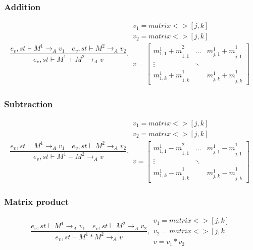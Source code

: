 \subsubsection{Addition}
\begin{equation}
	\frac { { e }_{ v },st\vdash { M }^{ 1 }{ \rightarrow  }_{ A }{ v }_{ 1 }\quad { e }_{ v },st\vdash { M }^{ 2 }{ \rightarrow  }_{ A }{ v }_{ 2 } }{ { e }_{ v },st\vdash { M }^{ 1 }+{ M }^{ 2 }{ \rightarrow  }_{ A }{ v } } ,\begin{matrix} { v }_{ 1 }=matrix<>[j,k] \\ { v }_{ 2 }=matrix<>[j,k] \\ v=\begin{bmatrix} { { m }_{ 1,1 }^{ 1 }+m }_{ 1,1 }^{ 2 } & \dots  & { { m }_{ j,1 }^{ 1 }+m }_{ j,1 }^{ 1 } \\ \vdots  & \ddots  &  \\ { { m }_{ 1,k }^{ 1 }+m }_{ 1,k }^{ 1 } &  & { { m }_{ j,k }^{ 1 }+m }_{ j,k }^{ 1 } \end{bmatrix} \end{matrix}
\end{equation}


\subsubsection{Subtraction}
\begin{equation}
	\frac { { e }_{ v },st\vdash { M }^{ 1 }{ \rightarrow  }_{ A }{ v }_{ 1 }\quad { e }_{ v },st\vdash { M }^{ 2 }{ \rightarrow  }_{ A }{ v }_{ 2 } }{ { e }_{ v },st\vdash { M }^{ 1 }-{ M }^{ 2 }{ \rightarrow  }_{ A }{ v } } ,\begin{matrix} { v }_{ 1 }=matrix<>[j,k] \\ { v }_{ 2 }=matrix<>[j,k] \\ v=\begin{bmatrix} { { m }_{ 1,1 }^{ 1 }-m }_{ 1,1 }^{ 2 } & \dots  & { { m }_{ j,1 }^{ 1 }-m }_{ j,1 }^{ 1 } \\ \vdots  & \ddots  &  \\ { { m }_{ 1,k }^{ 1 }-m }_{ 1,k }^{ 1 } &  & { { m }_{ j,k }^{ 1 }-m }_{ j,k }^{ 1 } \end{bmatrix} \end{matrix}
\end{equation}


\subsubsection{Matrix product}
\begin{equation}
	\frac { { e }_{ v },st\vdash { M }^{ 1 }{ \rightarrow  }_{ A }{ v }_{ 1 }\quad { e }_{ v },st\vdash { M }^{ 2 }{ \rightarrow  }_{ A }{ v }_{ 2 } }{ { e }_{ v },st\vdash { M }^{ 1 }*{ M }^{ 2 }{ \rightarrow  }_{ A }{ v } } ,\begin{matrix} { v }_{ 1 }=matrix<>[j,k] \\ { v }_{ 2 }=matrix<>[j,k] \\ v={ v }_{ 1 }*{ v }_{ 2 } \end{matrix}
\end{equation}

